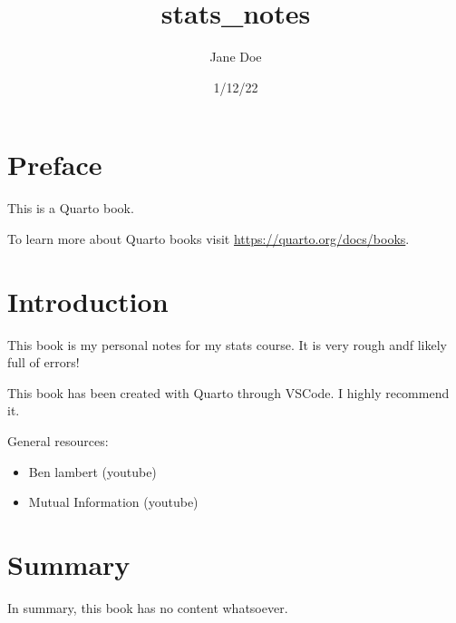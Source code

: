 \documentclass[
  letterpaper,
  DIV=11,
  numbers=noendperiod]{scrreprt}
\title{stats\_notes}
\author{Jane Doe}
\date{1/12/22}
\providecommand{\tightlist}{%
  \setlength{\itemsep}{0pt}\setlength{\parskip}{0pt}}\usepackage{longtable,booktabs,array}
\renewcommand*\contentsname{Table of contents}
\newcommand\contentsname{Table of contents}
\begin{document}
\maketitle
\ifdefined\Shaded\renewenvironment{Shaded}{\begin{tcolorbox}[interior hidden, sharp corners, breakable, boxrule=0pt, borderline west={3pt}{0pt}{shadecolor}, enhanced, frame hidden]}{\end{tcolorbox}}\fi

\renewcommand*\contentsname{Table of contents}
{
\hypersetup{linkcolor=}
\setcounter{tocdepth}{2}
\tableofcontents
}

\hypertarget{preface}{%
\chapter*{Preface}\label{preface}}


This is a Quarto book.

To learn more about Quarto books visit
\url{https://quarto.org/docs/books}.


\hypertarget{introduction}{%
\chapter{Introduction}\label{introduction}}

This book is my personal notes for my stats course. It is very rough
andf likely full of errors!

This book has been created with Quarto through VSCode. I highly
recommend it.

General resources:

\begin{itemize}
\tightlist
\item
  Ben lambert (youtube)
\item
  Mutual Information (youtube)
\end{itemize}


\hypertarget{summary}{%
\chapter{Summary}\label{summary}}

In summary, this book has no content whatsoever.
\end{document}
